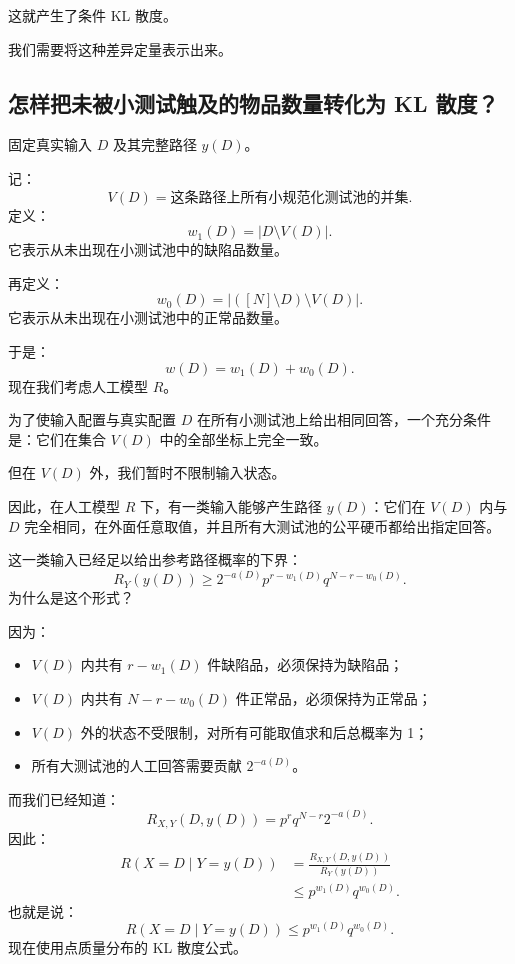 \documentclass[UTF8,11pt]{ctexart}
\begin{document}
这就产生了条件 KL 散度。

我们需要将这种差异定量表示出来。

\subsection{怎样把未被小测试触及的物品数量转化为 KL 散度？}
固定真实输入 $D$ 及其完整路径 $y(D)$。

记：
\[V(D)=\text{这条路径上所有小规范化测试池的并集}.\]
定义：
\[w_1(D)=|D\setminus V(D)|.\]
它表示从未出现在小测试池中的缺陷品数量。

再定义：
\[w_0(D)=|([N]\setminus D)\setminus V(D)|.\]
它表示从未出现在小测试池中的正常品数量。

于是：
\[w(D)=w_1(D)+w_0(D).\]
现在我们考虑人工模型 $R$。

为了使输入配置与真实配置 $D$ 在所有小测试池上给出相同回答，一个充分条件是：它们在集合 $V(D)$ 中的全部坐标上完全一致。

但在 $V(D)$ 外，我们暂时不限制输入状态。

因此，在人工模型 $R$ 下，有一类输入能够产生路径 $y(D)$：它们在 $V(D)$ 内与 $D$ 完全相同，在外面任意取值，并且所有大测试池的公平硬币都给出指定回答。

这一类输入已经足以给出参考路径概率的下界：
\begin{equation}
\boxed{R_Y(y(D))\ge2^{-a(D)}p^{r-w_1(D)}q^{N-r-w_0(D)}.}
\tag{35}
\end{equation}
为什么是这个形式？

因为：
\begin{itemize}
\item $V(D)$ 内共有 $r-w_1(D)$ 件缺陷品，必须保持为缺陷品；
\item $V(D)$ 内共有 $N-r-w_0(D)$ 件正常品，必须保持为正常品；
\item $V(D)$ 外的状态不受限制，对所有可能取值求和后总概率为 1；
\item 所有大测试池的人工回答需要贡献 $2^{-a(D)}$。
\end{itemize}
而我们已经知道：
\[R_{X,Y}(D,y(D))=p^rq^{N-r}2^{-a(D)}.\]
因此：
\[
\begin{aligned}
R(X=D\mid Y=y(D))
&=\frac{R_{X,Y}(D,y(D))}{R_Y(y(D))}\\
&\le p^{w_1(D)}q^{w_0(D)}.
\end{aligned}
\]
也就是说：
\begin{equation}\boxed{R(X=D\mid Y=y(D))\le p^{w_1(D)}q^{w_0(D)}.}\tag{36}\end{equation}
现在使用点质量分布的 KL 散度公式。
\end{document}
